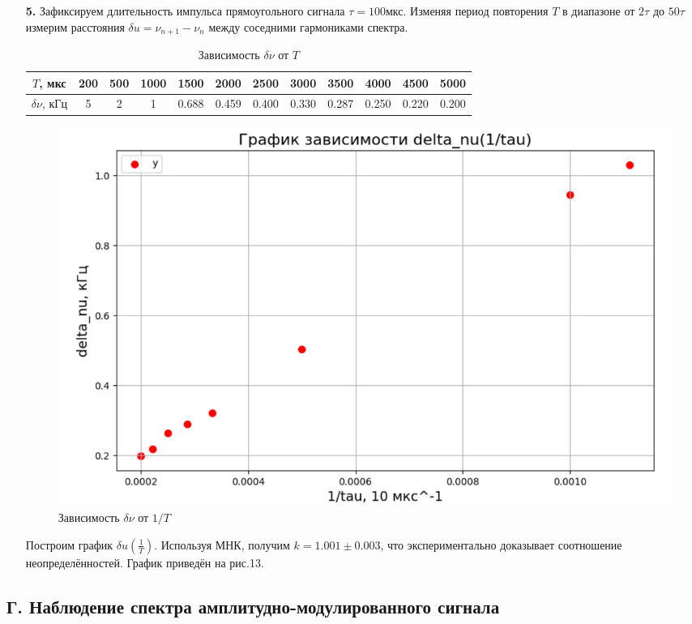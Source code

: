 \documentclass[a4paper,12pt]{article}
\theoremstyle{definition}
\begin{document}
\begin{enumerate}
\item[\textbf{5.}]
Зафиксируем длительность импульса прямоугольного сигнала $\tau = 100 \text{мкс}$. Изменяя период повторения $T$ в диапазоне от $2\tau$ до $50\tau$ измерим расстояния $\delta
u = \nu_{n+1} - \nu_n$ между соседними гармониками спектра.
\begin{table}[h!]
\centering
\begin{tabular}{|c|c|c|c|c|c|c|c|c|c|c|c|}
\hline
$T$, мкс & 200 & 500 & 1000 & 1500 & 2000 & 2500 & 3000 & 3500 & 4000 & 4500 & 5000 \\ \hline
$\delta \nu$, кГц & 5 & 2 & 1 & 0.688 & 0.459 & 0.400 & 0.330 & 0.287& 0.250 & 0.220& 0.200 \\ \hline
\end{tabular}
\caption{Зависимость $\delta \nu$ от $T$}
\label{table3}
\end{table}
\begin{figure}[H] %
\centering
\includegraphics[width=0.7\linewidth]{Снимок экрана 2024-12-20 222153.png}
\caption{Зависимость $\delta \nu$ от $1/T$}
\label{grafic2}
\end{figure}
Построим график $\delta
u\left(\frac{1}{T}\right)$. Используя МНК, получим $k=1.001\pm0.003$, что экспериментально доказывает соотношение неопределённостей. График приведён на рис.13.
\end{enumerate}
\subsection*{Г. Наблюдение спектра амплитудно-модулированного сигнала}
\end{document}

